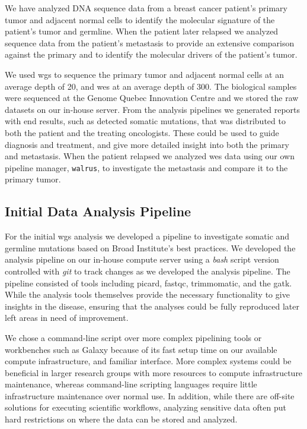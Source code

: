 We have analyzed DNA sequence data from a breast cancer patient's
primary tumor and adjacent normal cells to identify the molecular signature of
the patient's tumor and germline. When the patient  later relapsed we analyzed
sequence data from the patient's metastasis to provide an extensive comparison
against the primary and to identify the molecular drivers of the patient's
tumor. 

We used \gls{wgs} to sequence the primary tumor and adjacent normal cells at an
average depth of 20, and \gls{wes} at an average depth of 300. The biological
samples were sequenced at the  Genome Quebec Innovation Centre and we stored the
raw datasets on our in-house server.  From the analysis pipelines we generated
reports with end results, such as detected somatic mutations, that was
distributed to both the patient and the treating oncologists. These could be
used to guide diagnosis and treatment, and give more detailed insight into both
the primary and metastasis.  When the patient relapsed we analyzed \gls{wes}
data using our own pipeline manager, \texttt{walrus}, to investigate the
metastasis and compare it to the primary tumor. 

\subsection{Initial Data Analysis Pipeline} 

For the initial \gls{wgs} analysis we developed a pipeline to investigate
somatic and germline mutations based on Broad Institute's best practices. We
developed the analysis pipeline on our in-house compute server using a
\emph{bash} script version controlled with \emph{git} to track changes as we
developed the analysis pipeline. The pipeline consisted of tools including
picard\cite{picard}, fastqc\cite{fastqc}, trimmomatic\cite{trimmomatic}, and the
\gls{gatk}.\cite{gatk} While the analysis tools themselves provide the necessary
functionality to give insights in the disease, 
ensuring that the analyses could be fully reproduced later left areas in need of
improvement.

We chose a command-line script over more complex pipelining tools or workbenches
such as Galaxy\cite{goecks2010galaxy} because of its fast setup time on our
available compute infrastructure, and familiar interface. More complex systems
could be beneficial in larger research groups with more resources to compute
infrastructure maintenance, whereas command-line scripting languages require
little infrastructure maintenance over normal use. In addition, while there are
off-site solutions for executing scientific workflows, analyzing sensitive data
often put hard restrictions on where the data can be stored and analyzed.


